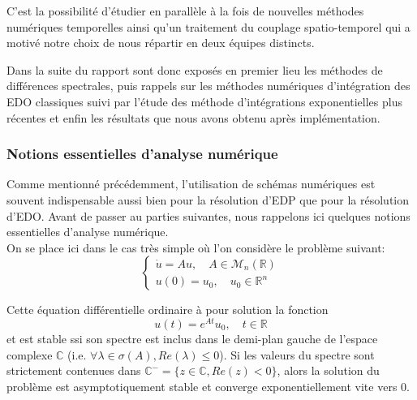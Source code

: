 C'est la possibilité d'étudier en parallèle à la fois de nouvelles méthodes numériques temporelles ainsi qu'un traitement du couplage spatio-temporel qui a motivé notre choix de nous répartir en deux équipes distincts.

Dans la suite du rapport sont donc exposés en premier lieu les méthodes de différences spectrales, puis rappels sur les méthodes numériques d'intégration des EDO classiques suivi par l'étude des méthode d'intégrations exponentielles plus récentes et enfin les résultats que nous avons obtenu après implémentation.
\subsubsection{Notions essentielles d'analyse numérique}
Comme mentionné précédemment, l'utilisation de schémas numériques est souvent indispensable aussi bien pour la résolution d'EDP que pour la résolution d'EDO. Avant de passer au parties suivantes, nous rappelons ici quelques notions essentielles d'analyse numérique.\\

On se place ici dans le cas très simple où l'on considère le problème suivant:
\begin{equation}
\left\{
    \begin{aligned}
        \dot{u} = A u, \quad  A \in \mathcal{M}_n(\mathbb{R})\\
        u(0) = u_0, \quad u_0 \in \mathbb{R}^n
    \end{aligned}
\right.
\label{eq:lin}
\end{equation}

Cette équation différentielle ordinaire à pour solution la fonction
$$
u(t) = e^{A t}u_0, \quad t\in \mathbb{R}
$$
et est stable ssi son spectre est inclus dans le demi-plan gauche de l'espace complexe $\mathbb{C}$ (i.e. $\forall \lambda \in \sigma(A), Re (\lambda) \leq 0$). Si les valeurs du spectre sont strictement contenues dans $\mathbb{C}^- = \{z\in \mathbb{C}, Re(z)<0\}$, alors la solution du problème est asymptotiquement stable et converge exponentiellement vite vers $0$.\\

